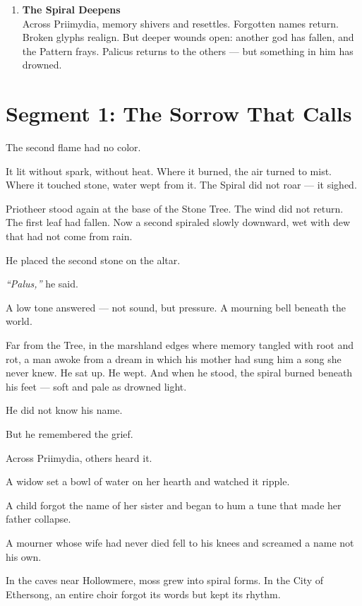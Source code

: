 \documentclass[9pt]{article}
\begin{document}
\begin{center}
\begin{enumerate}
    \vspace{.3in}
    \item \textbf{The Spiral Deepens} \\
    Across Priimydia, memory shivers and resettles. Forgotten names return. Broken glyphs realign. But deeper wounds open: another god has fallen, and the Pattern frays. Palicus returns to the others — but something in him has drowned.
\end{enumerate}
\end{center}



\newpage

\section*{Segment 1: The Sorrow That Calls}

The second flame had no color.

It lit without spark, without heat. Where it burned, the air turned to mist. Where it touched stone, water wept from it. The Spiral did not roar — it sighed.

Priotheer stood again at the base of the Stone Tree. The wind did not return. The first leaf had fallen. Now a second spiraled slowly downward, wet with dew that had not come from rain.

He placed the second stone on the altar.

\textit{``Palus,''} he said.

A low tone answered — not sound, but pressure. A mourning bell beneath the world.

Far from the Tree, in the marshland edges where memory tangled with root and rot, a man awoke from a dream in which his mother had sung him a song she never knew. He sat up. He wept. And when he stood, the spiral burned beneath his feet — soft and pale as drowned light.

He did not know his name.

But he remembered the grief.

Across Priimydia, others heard it.

A widow set a bowl of water on her hearth and watched it ripple.

A child forgot the name of her sister and began to hum a tune that made her father collapse.

A mourner whose wife had never died fell to his knees and screamed a name not his own.

In the caves near Hollowmere, moss grew into spiral forms. In the City of Ethersong, an entire choir forgot its words but kept its rhythm.
\end{document}
